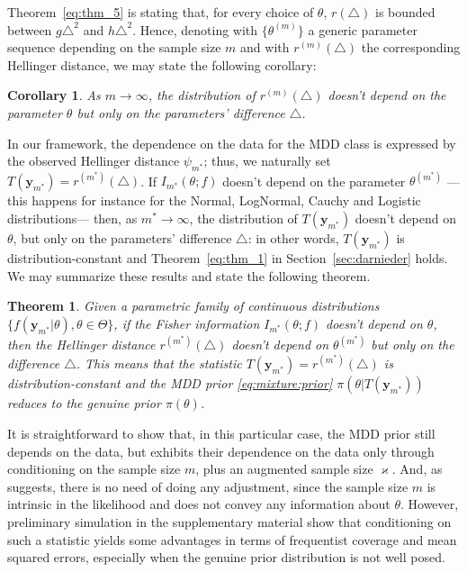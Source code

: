 \documentclass{statsoc}
\newtheorem{thm}{Theorem}
\newtheorem{corl}{Corollary}
\begin{document}
Theorem~\eqref{eq:thm_5} is stating that, for every choice of $\theta$, $ r(\triangle)$ is bounded between $g \triangle^{2}$ and $h \triangle^{2}$. Hence, denoting with $ \{ \theta^{(m)} \}$ a generic parameter sequence depending on the sample size $m$ and with $r^{(m)}(\triangle)$ the corresponding Hellinger distance, we may state the following corollary:

\begin{corl}

As $m \rightarrow \infty$, the distribution of $r^{(m)}(\triangle)$ doesn't depend on the parameter $\theta$ but only on the parameters' difference $\triangle$. 

\end{corl}

In our framework, the dependence on the data for the MDD class is expressed by the observed Hellinger distance $\psi_{m^{*}}$; thus,  we naturally set $T(\bm{y}_{m^{*}})= r^{(m^{*})}(\triangle)$. If $I_{m^{*}}(\theta;f)$ doesn't depend on the parameter $\theta^{(m^{*})}$ ---this happens for instance for the Normal, LogNormal, Cauchy and Logistic distributions--- then, as $m^{*} \rightarrow \infty$, the distribution of $T(\bm{y}_{m^{*}})$ doesn't depend on $\theta$, but only on the parameters' difference $\triangle$: in other words, $T(\bm{y}_{m^{*}})$ is distribution-constant and Theorem~\ref{eq:thm_1} in Section~\ref{sec:darnieder} holds. We may summarize these results and state the following theorem.

\begin{thm}

Given a parametric family of continuous distributions $\{f(\bm{y}_{m^{*}}| \theta), \theta \in \Theta \}$, if the Fisher information $I_{m^{*}}(\theta;f)$ doesn't depend on $\theta$, then the Hellinger distance $r^{(m^{*})}(\triangle)$ doesn't depend on $\theta^{(m^{*})}$ but only on the difference $\triangle$. This means that the statistic $T(\bm{y}_{m^{*}})= r^{(m^{*})}(\triangle) $ is distribution-constant and the MDD prior \eqref{eq:mixture:prior} $\pi(\theta | T(\bm{y}_{m^{*}}))$ reduces to the genuine prior $\pi(\theta)$.
\end{thm}

It is straightforward to show that, in this particular case, the MDD prior still depends on the data, but exhibits their dependence on the data only through conditioning on the sample size $m$, plus an augmented sample size $\varkappa$. And, as \cite{darnieder2011bayesian} suggests, there is no need of doing any adjustment, since the sample size $m$ is intrinsic in the likelihood and does not convey any information about $\theta$. However, preliminary simulation in the supplementary material show that conditioning on such a statistic yields some advantages in terms of frequentist coverage and mean squared errors, especially when the genuine prior distribution is not well posed. 
\end{document}
